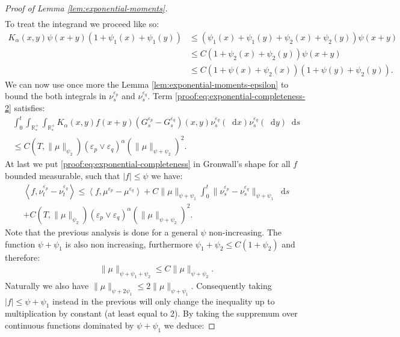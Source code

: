 \documentclass[11pt,a4paper]{article}
\newcommand{\RRP}{\mathbb{R}^+_*}
\newcommand{\brac}[1]{\left\langle#1\right\rangle}
\newcommand{\dd}{\mathop{}\!\mathrm{d}}
\begin{document}
\begin{proof}[Proof of Lemma \ref{lem:exponential-moments}]
\begin{multline*}
    \end{multline*}
    To treat the integrand we proceed like so:
    \begin{align*}
        K_\alpha(x,y)\psi(x+y)\left(1 + \psi_1(x) + \psi_1(y) \right) 
        &\leq \left(\psi_1(x) + \psi_1(y) + \psi_2(x) + \psi_2(y)\right)\psi(x+y) \\
        &\leq C\left(1 + \psi_2(x) + \psi_2(y)\right)\psi(x+y) \\
        &\leq C\left(1 + \psi(x) + \psi_2(x)\right)\left(1 + \psi(y)+ \psi_2(y)\right).
    \end{align*}
    We can now use once more the Lemma \ref{lem:exponential-moments-epsilon} to bound the both integrals in $ \nu_s^{\varepsilon_p}$ and $\nu_s^{\varepsilon_q}$. Term \eqref{proof:eq:exponential-completeness-2} satisfies:
    \begin{align*}
        \int_0^t\int_{\RRP}\int_{\RRP}K_\alpha(x,y)f(x+y) (G^{\varepsilon_p}_s - G^{\varepsilon_q}_s)(x,y)\nu_s^{\varepsilon_q}(\dd x)\nu_s^{\varepsilon_q}(\dd y) \dd s \\
        \leq C\left(T,\|\mu\|_{\psi_2}\right)\left(\varepsilon_p \vee \varepsilon_q \right)^{\alpha} \left(\|\mu\|_{\psi + \psi_2}\right)^2.
    \end{align*}
    At last we put \eqref{proof:eq:exponential-completeness} in Gronwall's shape for all $f$ bounded measurable, such that  $|f| \leq \psi$ we have:
    \begin{multline*}
        \brac{f,\nu_t^{\varepsilon_p}-\nu_t^{\varepsilon_q}} \leq  \brac{f,\mu^{\varepsilon_p} - \mu^{\varepsilon_q}} + C\|\mu\|_{\psi + \psi_1}\int_0^t \|\nu_s^{\varepsilon_p}-\nu_s^{\varepsilon_q}\|_{\psi + \psi_1}\dd s \\
        + C\left(T,\|\mu\|_{\psi_2}\right)\left(\varepsilon_p \vee \varepsilon_q \right)^{\alpha} \left(\|\mu\|_{\psi + \psi_2}\right)^2.
    \end{multline*}
    Note that the previous analysis is done for a general $\psi$ non-increasing. The function $\psi + \psi_1$ is also non increasing, furthermore $\psi_1 + \psi_2 \leq C(1 + \psi_2)$ and therefore:
    \begin{align*}
        \|\mu\|_{\psi + \psi_1 + \psi_2} \leq C\|\mu\|_{\psi + \psi_2}.
    \end{align*}
    Naturally we also have $\|\mu\|_{\psi + 2\psi_1} \leq 2 \|\mu\|_{\psi + \psi_1}$. Consequently taking $|f| \leq \psi + \psi_1$ instead in the previous will only change the inequality up to multiplication by constant (at least equal to $2$). By taking the suppremum over continuous functions dominated by $\psi + \psi_1$ we deduce:

\end{proof}
\end{document}
